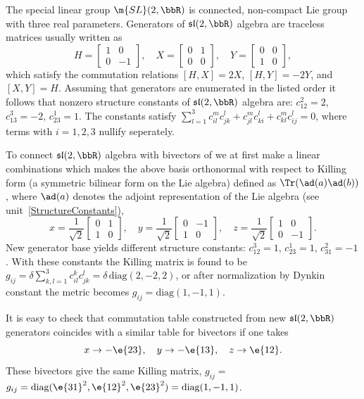 \begin{example}\label{SL2R} The special linear group $\m{SL}(2,\bbR)$ is
connected, non-compact Lie group with three real parameters.
Generators of $\mathfrak{sl}(2,\bbR)$ algebra are traceless
matrices usually written as
\[H=\begin{bmatrix}1&0\\0&-1\end{bmatrix},\quad
X=\begin{bmatrix}0&1\\0&0\end{bmatrix},\quad
Y=\begin{bmatrix}0&0\\1&0\end{bmatrix}, \] which
satisfy the commutation relations $[H,X]=2X$, $[H,Y]=-2Y$, and
$[X,Y]=H$. Assuming that generators are enumerated in the listed order it follows that nonzero structure constants of $\mathfrak{sl}(2,\bbR)$ algebra are: $c_{12}^2=2$, $c_{13}^3=-2$, $c_{23}^1=1$.
The constants satisfy $\sum_{l=1}^3 c_{il}^m c_{jk}^l+c_{jl}^m
c_{ki}^l+c_{kl}^m c_{ij}^l=0$, where terms with $i=1,2,3$ nullify
seperately.

To connect $\mathfrak{sl}(2,\bbR)$ algebra with bivectors of
 we at first make a linear combinations which makes the
above basis orthonormal with respect to Killing form (a symmetric
bilinear form on the Lie algebra) defined as $\Tr (\ad(a) \ad(b))$,
where $\ad(a)$ denotes the adjoint representation of the Lie
algebra (see unit~\ref{StructureConstants}),
\[x=\frac{1}{\sqrt{2}}\begin{bmatrix}0&1\\1&0\end{bmatrix},\quad
y=\frac{1}{\sqrt{2}}\begin{bmatrix}0&-1\\1&0\end{bmatrix},\quad
z=\frac{1}{\sqrt{2}}\begin{bmatrix}1&0\\0&-1\end{bmatrix}.
\] 
New generator base yields different structure constants: $c_{12}^3=1$,
$c_{23}^1=1$, $c_{31}^2=-1$. With these constants the Killing
matrix is found to be $g_{ij}=\delta\sum_{k,l=1}^3 c_{il}^k
c_{jk}^l=\delta\,\textrm{diag}(2,-2,2)$, or after normalization by Dynkin
constant the metric becomes $g_{ij}=\textrm{diag}(1,-1,1)$.

 It is easy to check that commutation table constructed from new
$\mathfrak{sl}(2,\bbR)$ generators coincides with a similar table
for  bivectors if one takes
\[x\rightarrow -\e{23},\quad y\rightarrow -\e{13},\quad z\rightarrow\e{12}.\]
These bivectors give the same Killing matrix, $g_{ij}=$
$g_{ij}=\textrm{diag}(\e{31}^2,\e{12}^2,\e{23}^2)=\textrm{diag}(1,-1,1)$.
\end{example}
